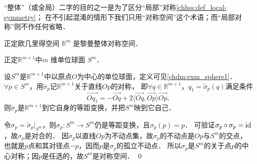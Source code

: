 “整体”（或全局）二字的目的之一是为了区分“局部”对称\ref{chhss:def_local-symmetry}；
在不引起混淆的情形下我们只用“对称空间”这个术语；而“局部对称”则不作任何省略．

\begin{example}
    正定欧几里得空间 $\mathbb{R}^m$ 是黎曼整体对称空间．
\end{example}    
\begin{example}
    正定$\mathbb{R}^{m+1}$中$m$ 维单位球面 $S^m$．
\end{example}    
设$S^m$是$\mathbb{R}^{m+1}$中以原点$O$为中心的单位球面，定义可见\ref{chdm:exm_sphere1}．
$\forall p \in S^m$，用$\tilde{\sigma}_p$记$\mathbb{R}^{m+1}$关于直线$Op$的对称，
即$\forall q \in \mathbb{R}^{m+1}$，$q_1=\tilde{\sigma}_p(q)$满足条件
\begin{equation}
    \overrightarrow{O q_1}=-\overrightarrow{O q}+ 
     2\langle\overrightarrow{O q}, \overrightarrow{O p}\rangle \overrightarrow{O p},
\end{equation}
则$\tilde{\sigma}_p$是$\mathbb{R}^{m+1}$到它自身的等距变换，并把$S^m$映到它自己．

令$\sigma_p=\tilde{\sigma}_p|_{S^m}$，则$\sigma_p:S^m\to S^m$仍是等距变换，且$\sigma_p(p)=p$．
可验证$\sigma_p\circ \sigma_p ={\rm id}$，故$\sigma_p$是对合的．
因$\tilde{\sigma}_p$以直线$Op$为不动点集，故$\sigma_p$的不动点是$Op$与$S^m$的交点，
也就是$p$点和其对径点$-p$，因而$p$是$\sigma_p$的孤立不动点．
所以$\sigma_p$是$S^m$的关于点$p$的中心对称；因$p$是任选的，故$S^m$是对称空间．
\qed





